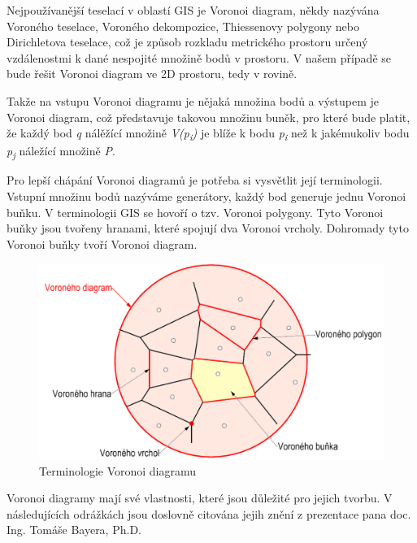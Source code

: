Nejpoužívanější teselací v oblastí GIS je Voronoi diagram, někdy nazývána Voroného teselace, Voroného dekompozice,
Thiessenovy polygony nebo Dirichletova teselace, což je způsob rozkladu 
metrického prostoru určený vzdálenostmi k dané nespojité množině bodů v prostoru.
V našem případě se bude řešit Voronoi diagram ve 2D prostoru, tedy v rovině.

Takže na vstupu Voronoi diagramu je nějaká množina bodů a výstupem je Voronoi diagram, 
což představuje takovou množinu buněk, pro které bude platit, že každý bod
\textit{q} nálěžící množině \textit{V(p\textsubscript{i})} je blíže k bodu
\textit{p\textsubscript{i}} než k jakémukoliv
bodu \textit{p\textsubscript{j}} náležící množině \textit{P}.  \cite{bayer-voronoi}

Pro lepší chápání Voronoi diagramů je potřeba si vysvětlit její terminologii.
Vstupní množinu bodů nazýváme generátory, každý bod generuje jednu Voronoi buňku. V 
terminologii GIS se hovoří o tzv. Voronoi polygony. Tyto Voronoi buňky jsou tvořeny hranami,
které spojují dva Voronoi vrcholy. Dohromady tyto Voronoi buňky tvoří Voronoi diagram.  

\begin{figure}[H] \centering
    \includegraphics[width=400pt]{./pictures/bayer-voronoi-terminologie.png}
    \caption[Terminologie Voronoi diagramu]{Terminologie Voronoi diagramu \cite{bayer-voronoi}}
	\label{fig:bayer-voronoi-terminologie}              
\end{figure}

Voronoi diagramy mají své vlastnosti, které jsou důležité pro jejich tvorbu. V následujících
odrážkách jsou doslovně citována jejih znění z prezentace pana doc. Ing. Tomáše Bayera, Ph.D.

